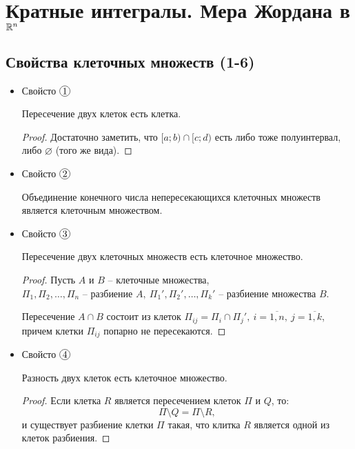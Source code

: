\section{Кратные интегралы. Мера Жордана в $\mathbb{R}^n$}

\setcounter{subsection}{126}

\subsection{Свойства клеточных множеств (1-6)}

\begin{itemize}
    \item Свойсто $ \circled{1} $
          \begin{statement}
              Пересечение двух клеток есть клетка.
          \end{statement}
          \begin{proof}
              Достаточно заметить, что $[a;b) \cap [c;d)$ есть либо тоже полуинтервал, либо $\varnothing$ (того же вида).
          \end{proof}

    \item Свойсто $ \circled{2} $
          \begin{statement}
              Объединение конечного числа непересекающихся клеточных множеств является клеточным множеством.
          \end{statement}

    \item Свойсто $ \circled{3} $
          \begin{statement}
              Пересечение двух клеточных множеств есть клеточное множество.
          \end{statement}
          \begin{proof}
              Пусть $A$ и $B$ -- клеточные множества, \\ $\Pi_1,\Pi_2,\ldots,\Pi_n$ -- разбиение $A, \ \Pi_1',\Pi_2',\ldots,\Pi_k'$ -- разбиение множества $B$.

              Пересечение $A \cap B$ состоит из клеток $\Pi_{ij} = \Pi_i \cap \Pi_j', \ i = \overline{1,n}, \ j = \overline{1,k}$, причем клетки $\Pi_{ij}$ попарно не пересекаются.
          \end{proof}


    \item Свойсто $ \circled{4} $
          \begin{statement}
              Разность двух клеток есть клеточное множество.
          \end{statement}
          \begin{proof}
              Если клетка $R$ является пересечением клеток $\Pi$ и $Q$, то:
              \[
                  \Pi \setminus Q = \Pi \setminus R,
              \]
              и существует разбиение клетки $\Pi$ такая, что клитка $R$ является одной из клеток разбиения.
          \end{proof}


\end{itemize}
